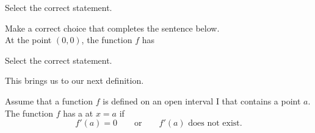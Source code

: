 \documentclass{ximera}
\begin{document}
  \begin{question}
Select the correct statement.
  \begin{multipleChoice}
  \end{multipleChoice}
\end{question}
\begin{question}
 Make a correct choice that completes the sentence below. \\
 
  At the point $(0,0)$, the  function $f$ has 

  \begin{multipleChoice}
  \end{multipleChoice}
  \end{question}
  \begin{question}
Select the correct statement.
  \begin{multipleChoice}
  \end{multipleChoice}
\end{question}

This brings us to our next definition.

\begin{definition}
  Assume that a function $f$ is defined on an open interval I that contains a point $a$. The  function $f$ has a  at $x=a$ if 
  \[
  f'(a) = 0\qquad\text{or}\qquad \text{$f'(a)$ does not exist.}
  \]
\end{definition}
\end{document}
